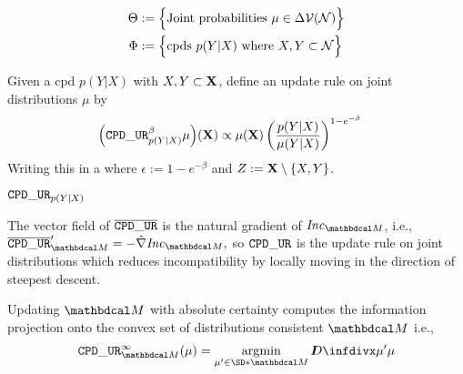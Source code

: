 \documentclass{article}
\newcommand{\ext}[1]{\overline #1} %
\begin{document}
\begin{align*}
	\Theta &:=
		\Big\{
		\text{Joint probabilities}~ \mu \in \Delta \mathcal V(\mathcal N)
		\Big\} \\
	\Phi &:= \Big\{ \text{cpds}~ p(Y|X)
		\text{ where }  X, Y \subset \mathcal N \Big\}
\end{align*}

Given a cpd $p(Y|X)$ with $X,Y \subset \mathbf{X}$,
define an update rule on joint distributions $\mu$ by
\begin{align*}
	\Big(\mathtt{CPD\_UR}_{p(Y|X)}^\beta \mu\Big) (\mathbf{X}) &\propto
		\mu(\mathbf{X}) \left(\frac{p(Y|X)}{\mu(Y|X)}\right)^{1 - e^{-\beta}}
\end{align*}
Writing this in a
where $\epsilon := 1-e^{-\beta}$ and $Z := \mathbf{X} \setminus \{X,Y\}$.

\begin{prop}
	$\mathtt{CPD\_UR}_{p(Y|X)}$
\end{prop}

\begin{prop}
	The vector field of $\ext\tauur$ is the natural gradient of $\Inc_{\dg M}$, i.e.,
	$
		\ext\tauur'_{\dg M} = - \hat \nabla \Inc_{\dg M},
	$
	so $\mathtt{CPD\_UR}$ is the update rule on joint distributions which reduces incompatibility by locally moving in the direction of steepest descent.
\end{prop}

\begin{prop}
		Updating $\dg M$ with absolute certainty computes the information projection onto the convex set of distributions consistent $\dg M$ i.e.,
		$$\displaystyle
			\tauur_{\dg M}^\infty(\mu) = \argmin_{\mu' \in \SD*{\dg M}} \kldiv{\mu'}{\mu}
		$$

\end{prop}
\end{document}
